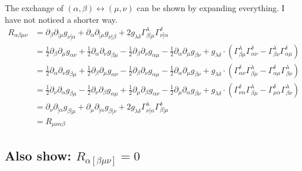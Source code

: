 The exchange of $(\alpha, \beta) \leftrightarrow (\mu, \nu)$ can be shown by
expanding everything. I have not noticed a shorter way.
\begin{align*}
    R_{\alpha\beta\mu\nu}
    &= \partial_\beta \partial_{[\mu} g_{\nu]\alpha}
    + \partial_\alpha \partial_{[\mu} g_{\nu]\beta}
    + 2 g_{\lambda\delta} \Gamma^\lambda_{\beta[\mu} \Gamma^\delta_{\nu]\alpha}
    \\
    &=
    \frac 12 \partial_\beta \partial_\mu g_{\alpha\nu}
    + \frac 12 \partial_\alpha \partial_\nu g_{\beta\mu}
    - \frac 12 \partial_\beta \partial_\nu g_{\alpha\mu}
    - \frac 12 \partial_\alpha \partial_\mu g_{\beta\nu}
    + g_{\lambda\delta} \cdot (
    \Gamma^\lambda_{\beta\mu} \Gamma^\delta_{\alpha\nu}
    - \Gamma^\lambda_{\beta\nu} \Gamma^\delta_{\alpha\mu}
    ) \\
    &=
    \frac 12 \partial_\alpha \partial_\nu g_{\beta\mu}
    + \frac 12 \partial_\beta \partial_\mu g_{\alpha\nu}
    - \frac 12 \partial_\beta \partial_\nu g_{\alpha\mu}
    - \frac 12 \partial_\alpha \partial_\mu g_{\beta\nu}
    + g_{\lambda\delta} \cdot (
    \Gamma^\delta_{\alpha\nu} \Gamma^\lambda_{\beta\mu} 
    - \Gamma^\delta_{\alpha\mu} \Gamma^\lambda_{\beta\nu} 
    ) \\
    &=
      \frac 12 \partial_\nu \partial_\alpha g_{\beta \mu}
    - \frac 12 \partial_\nu \partial_\beta  g_{\alpha\mu}
    + \frac 12 \partial_\mu \partial_\beta  g_{\alpha\nu}
    - \frac 12 \partial_\mu \partial_\alpha g_{\beta \nu}
    + g_{\lambda\delta} \cdot (
    \Gamma^\delta_{\nu\alpha} \Gamma^\lambda_{\beta\mu} 
    - \Gamma^\delta_{\mu\alpha} \Gamma^\lambda_{\beta\nu} 
    ) \\
    &= \partial_\nu \partial_{[\alpha} g_{\beta]\mu}
    + \partial_\mu \partial_{[\alpha} g_{\beta]\nu}
    + 2 g_{\lambda\delta} \Gamma^\lambda_{\nu[\alpha} \Gamma^\delta_{\beta]\mu}
    \\
    &=
    R_{\mu\nu\alpha\beta}
\end{align*}

\subsection{Also show: $R_{\alpha[\beta\mu\nu]} = 0$}


\newcommand\rdef[4]{%
    \partial_#2 \partial_{[#3} g_{#4]#1}
    + \partial_#1 \partial_{[#3} g_{#4]#2}
    + 2 g_{\lambda\delta} \Gamma^\lambda_{#2[#3} \Gamma^\delta_{#4]#1}
}

